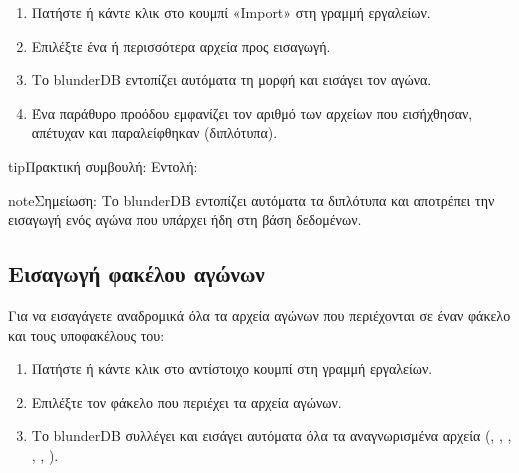 \documentclass[letterpaper,10pt,greek]{sphinxmanual}
\begin{document}
\sphinxAtStartPar
{}
\begin{enumerate}
%
\item {} 
\sphinxAtStartPar
Πατήστε  ή κάντε κλικ στο κουμπί «Import» στη γραμμή εργαλείων.

\item {} 
\sphinxAtStartPar
Επιλέξτε ένα ή περισσότερα αρχεία προς εισαγωγή.

\item {} 
\sphinxAtStartPar
Το blunderDB εντοπίζει αυτόματα τη μορφή και εισάγει τον αγώνα.

\item {} 
\sphinxAtStartPar
Ένα παράθυρο προόδου εμφανίζει τον αριθμό των αρχείων που εισήχθησαν, απέτυχαν και παραλείφθηκαν (διπλότυπα).

\end{enumerate}

\begin{sphinxadmonition}{tip}{Πρακτική συμβουλή:}
\sphinxAtStartPar
Εντολή: 
\end{sphinxadmonition}

\begin{sphinxadmonition}{note}{Σημείωση:}
\sphinxAtStartPar
Το blunderDB εντοπίζει αυτόματα τα διπλότυπα και αποτρέπει την εισαγωγή ενός αγώνα που υπάρχει ήδη στη βάση δεδομένων.
\end{sphinxadmonition}


\subsection{Εισαγωγή φακέλου αγώνων}
\label{\detokenize{guide_utilisateur:importer-un-dossier-de-matchs}}
\sphinxAtStartPar
Για να εισαγάγετε αναδρομικά όλα τα αρχεία αγώνων που περιέχονται σε έναν φάκελο και τους υποφακέλους του:
\begin{enumerate}
%
\item {} 
\sphinxAtStartPar
Πατήστε  ή κάντε κλικ στο αντίστοιχο κουμπί στη γραμμή εργαλείων.

\item {} 
\sphinxAtStartPar
Επιλέξτε τον φάκελο που περιέχει τα αρχεία αγώνων.

\item {} 
\sphinxAtStartPar
Το blunderDB συλλέγει και εισάγει αυτόματα όλα τα αναγνωρισμένα αρχεία (, , , , , ).

\end{enumerate}
\end{document}
